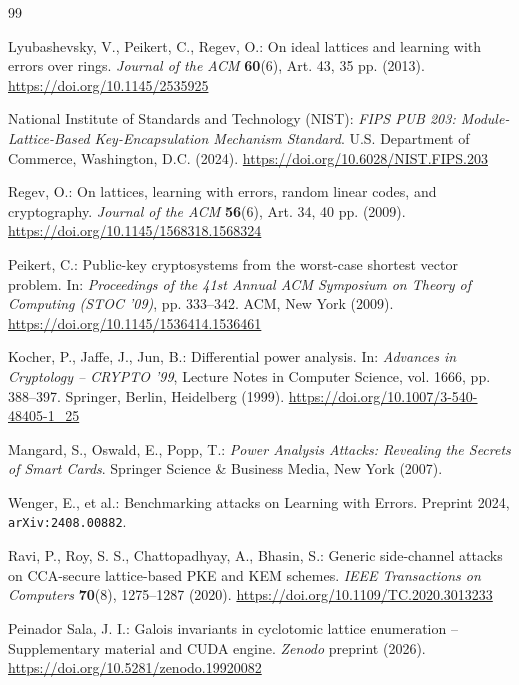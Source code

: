 \documentclass[11pt,a4paper]{article}
\theoremstyle{plain}
\theoremstyle{definition}
\numberwithin{equation}{section}
\begin{document}
\begin{thebibliography}{99}

Lyubashevsky, V., Peikert, C., Regev, O.:
On ideal lattices and learning with errors over rings.
\emph{Journal of the ACM} \textbf{60}(6), Art. 43, 35 pp. (2013). \url{https://doi.org/10.1145/2535925}

National Institute of Standards and Technology (NIST):
\emph{FIPS PUB 203: Module-Lattice-Based Key-Encapsulation Mechanism Standard}.
U.S. Department of Commerce, Washington, D.C. (2024). \url{https://doi.org/10.6028/NIST.FIPS.203}

Regev, O.:
On lattices, learning with errors, random linear codes, and cryptography.
\emph{Journal of the ACM} \textbf{56}(6), Art. 34, 40 pp. (2009). \url{https://doi.org/10.1145/1568318.1568324}

Peikert, C.:
Public-key cryptosystems from the worst-case shortest vector problem.
In: \emph{Proceedings of the 41st Annual ACM Symposium on Theory of Computing (STOC '09)}, pp. 333--342. ACM, New York (2009). \url{https://doi.org/10.1145/1536414.1536461}

Kocher, P., Jaffe, J., Jun, B.:
Differential power analysis.
In: \emph{Advances in Cryptology -- CRYPTO '99}, Lecture Notes in Computer Science, vol. 1666, pp. 388--397. Springer, Berlin, Heidelberg (1999). \url{https://doi.org/10.1007/3-540-48405-1_25}

Mangard, S., Oswald, E., Popp, T.:
\emph{Power Analysis Attacks: Revealing the Secrets of Smart Cards}.
Springer Science \& Business Media, New York (2007).

Wenger, E., et al.:
Benchmarking attacks on Learning with Errors.
Preprint 2024, \texttt{arXiv:2408.00882}.

Ravi, P., Roy, S. S., Chattopadhyay, A., Bhasin, S.:
Generic side-channel attacks on CCA-secure lattice-based PKE and KEM schemes.
\emph{IEEE Transactions on Computers} \textbf{70}(8), 1275--1287 (2020). \url{https://doi.org/10.1109/TC.2020.3013233}

Peinador Sala, J. I.:
Galois invariants in cyclotomic lattice enumeration -- Supplementary material and CUDA engine.
\emph{Zenodo} preprint (2026). \url{https://doi.org/10.5281/zenodo.19920082}


\end{thebibliography}
\end{document}
